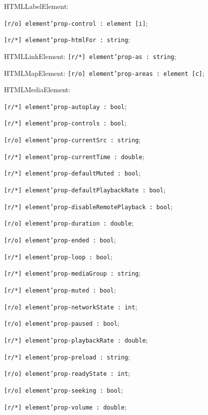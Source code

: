 \begin{icItems}
	\item HTMLLabelElement:
	\begin{icItems}
		\item \texttt{[r/o] element'prop-control : element [i]};
		\item \texttt{[r/*] element'prop-htmlFor : string};
	\end{icItems}
	
	\item HTMLLinkElement: \texttt{[r/*] element'prop-as : string};
	\item HTMLMapElement: \texttt{[r/o] element'prop-areas : element [c]};
	
	\item HTMLMediaElement:
	\begin{icItems}
		\item \texttt{[r/*] element'prop-autoplay : bool};
		\item \texttt{[r/*] element'prop-controls : bool};
		\item \texttt{[r/o] element'prop-currentSrc : string};
		\item \texttt{[r/*] element'prop-currentTime : double};
		\item \texttt{[r/*] element'prop-defaultMuted : bool};
		\item \texttt{[r/*] element'prop-defaultPlaybackRate : bool};
		\item \texttt{[r/*] element'prop-disableRemotePlayback : bool};
		\item \texttt{[r/o] element'prop-duration : double};
		\item \texttt{[r/o] element'prop-ended : bool};
		\item \texttt{[r/*] element'prop-loop : bool};
		\item \texttt{[r/*] element'prop-mediaGroup : string};
		\item \texttt{[r/*] element'prop-muted : bool};
		\item \texttt{[r/o] element'prop-networkState : int};
		\item \texttt{[r/o] element'prop-paused : bool};
		\item \texttt{[r/*] element'prop-playbackRate : double};
		\item \texttt{[r/*] element'prop-preload : string};
		\item \texttt{[r/o] element'prop-readyState : int};
		\item \texttt{[r/o] element'prop-seeking : bool};
		\item \texttt{[r/*] element'prop-volume : double};
	\end{icItems}
	

\end{icItems}
